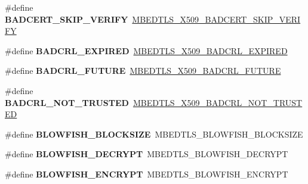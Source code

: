 \begin{DoxyCompactItemize}
\item 
\mbox{\label{compat-1_83_8h_a70f5b5dce099c759ac5a49489587c385}} 
\#define {\bfseries B\+A\+D\+C\+E\+R\+T\+\_\+\+S\+K\+I\+P\+\_\+\+V\+E\+R\+I\+FY}~\mbox{\hyperlink{group__x509__module_ga1b87b2e1d26077023adf2a5c65a76776}{M\+B\+E\+D\+T\+L\+S\+\_\+\+X509\+\_\+\+B\+A\+D\+C\+E\+R\+T\+\_\+\+S\+K\+I\+P\+\_\+\+V\+E\+R\+I\+FY}}
\item 
\mbox{\label{compat-1_83_8h_ad5d4bfa3090cb468e734596094f39a1f}} 
\#define {\bfseries B\+A\+D\+C\+R\+L\+\_\+\+E\+X\+P\+I\+R\+ED}~\mbox{\hyperlink{group__x509__module_gaebccb1707af21f2d3d6610a7c6485f32}{M\+B\+E\+D\+T\+L\+S\+\_\+\+X509\+\_\+\+B\+A\+D\+C\+R\+L\+\_\+\+E\+X\+P\+I\+R\+ED}}
\item 
\mbox{\label{compat-1_83_8h_a8dbe1ef936bb47a2f13759e7e4380be0}} 
\#define {\bfseries B\+A\+D\+C\+R\+L\+\_\+\+F\+U\+T\+U\+RE}~\mbox{\hyperlink{group__x509__module_gad93c0f614969729f7d13fb0a3acac68e}{M\+B\+E\+D\+T\+L\+S\+\_\+\+X509\+\_\+\+B\+A\+D\+C\+R\+L\+\_\+\+F\+U\+T\+U\+RE}}
\item 
\mbox{\label{compat-1_83_8h_ad3e80bd3df035edaa81dcd44da586153}} 
\#define {\bfseries B\+A\+D\+C\+R\+L\+\_\+\+N\+O\+T\+\_\+\+T\+R\+U\+S\+T\+ED}~\mbox{\hyperlink{group__x509__module_gad1da8228ca957c2947fd329c32fc7ca4}{M\+B\+E\+D\+T\+L\+S\+\_\+\+X509\+\_\+\+B\+A\+D\+C\+R\+L\+\_\+\+N\+O\+T\+\_\+\+T\+R\+U\+S\+T\+ED}}
\item 
\mbox{\label{compat-1_83_8h_a47a29de4f2d383c17ca87cf34b05f047}} 
\#define {\bfseries B\+L\+O\+W\+F\+I\+S\+H\+\_\+\+B\+L\+O\+C\+K\+S\+I\+ZE}~M\+B\+E\+D\+T\+L\+S\+\_\+\+B\+L\+O\+W\+F\+I\+S\+H\+\_\+\+B\+L\+O\+C\+K\+S\+I\+ZE
\item 
\mbox{\label{compat-1_83_8h_aef79827b2885cff8b753e01521552942}} 
\#define {\bfseries B\+L\+O\+W\+F\+I\+S\+H\+\_\+\+D\+E\+C\+R\+Y\+PT}~M\+B\+E\+D\+T\+L\+S\+\_\+\+B\+L\+O\+W\+F\+I\+S\+H\+\_\+\+D\+E\+C\+R\+Y\+PT
\item 
\mbox{\label{compat-1_83_8h_a08181b24dc6716d2ce995653d1bf9263}} 
\#define {\bfseries B\+L\+O\+W\+F\+I\+S\+H\+\_\+\+E\+N\+C\+R\+Y\+PT}~M\+B\+E\+D\+T\+L\+S\+\_\+\+B\+L\+O\+W\+F\+I\+S\+H\+\_\+\+E\+N\+C\+R\+Y\+PT
\item 

\end{DoxyCompactItemize}
